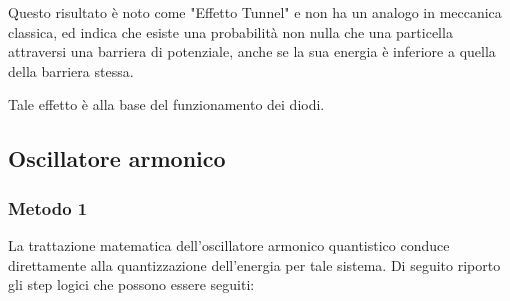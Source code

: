 \documentclass{article}
\begin{document}
Questo risultato è noto come "Effetto Tunnel" e non ha un analogo in meccanica classica, ed indica che esiste una probabilità non nulla
che una particella attraversi una barriera di potenziale, anche se la sua energia è inferiore a quella della barriera stessa.

Tale effetto è alla base del funzionamento dei diodi.



\subsection{Oscillatore armonico}
\subsubsection{Metodo 1}
La trattazione matematica dell'oscillatore armonico quantistico conduce direttamente alla quantizzazione dell'energia per tale sistema.
Di seguito riporto gli step logici che possono essere seguiti:
\end{document}
